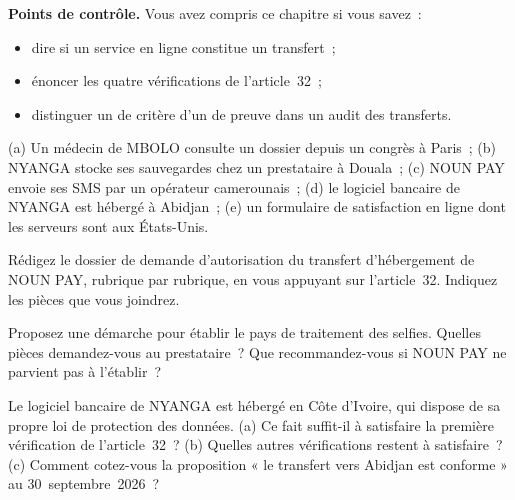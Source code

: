 \begin{boxinfo}
\textbf{Points de contrôle.} Vous avez compris ce chapitre si vous savez~:
\begin{itemize}
    \item dire si un service en ligne constitue un transfert~;
    \item énoncer les quatre vérifications de l'article~32~;
    \item distinguer un \NEK{} de critère d'un \NEK{} de preuve dans un audit
          des transferts.
\end{itemize}
\end{boxinfo}

\begin{boxexo}[title={\ding{45}\quad Exercice~11.1. Transfert ou non \niveaubase}]
(a) Un médecin de MBOLO consulte un dossier depuis un congrès à Paris~;
(b) NYANGA stocke ses sauvegardes chez un prestataire à Douala~; (c) NOUN
PAY envoie ses SMS par un opérateur camerounais~; (d) le logiciel bancaire
de NYANGA est hébergé à Abidjan~; (e) un formulaire de satisfaction en ligne
dont les serveurs sont aux États-Unis.
\end{boxexo}

\begin{boxexo}[title={\ding{45}\quad Exercice~11.2. Le dossier d'autorisation \niveaumoyen}]
Rédigez le dossier de demande d'autorisation du transfert d'hébergement de
NOUN PAY, rubrique par rubrique, en vous appuyant sur l'article~32.
Indiquez les pièces que vous joindrez.
\end{boxexo}

\begin{boxexo}[title={\ding{45}\quad Exercice~11.3. Les selfies \niveaumoyen}]
Proposez une démarche pour établir le pays de traitement des selfies.
Quelles pièces demandez-vous au prestataire~? Que recommandez-vous si
NOUN PAY ne parvient pas à l'établir~?
\end{boxexo}

\begin{boxexo}[title={\ding{45}\quad Exercice~11.4. Abidjan \niveauexpert}]
Le logiciel bancaire de NYANGA est hébergé en Côte d'Ivoire, qui dispose de
sa propre loi de protection des données. (a) Ce fait suffit-il à satisfaire
la première vérification de l'article~32~? (b) Quelles autres
vérifications restent à satisfaire~? (c) Comment cotez-vous la proposition
« le transfert vers Abidjan est conforme » au 30~septembre~2026~?
\end{boxexo}

